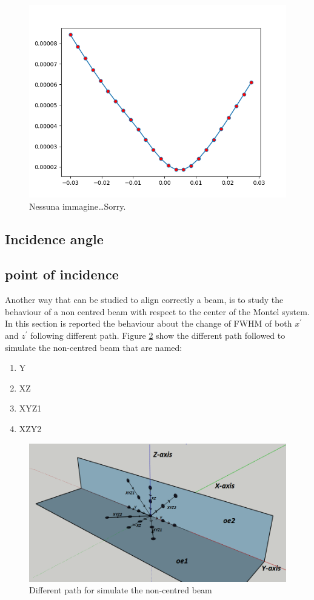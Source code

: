 \begin{figure}
%
\centering
%
\includegraphics[width=.6\textwidth]{Immagini/Chapter5/FWHMChangingOrt}
%
\caption{Nessuna immagine\dots Sorry.}
%
\label{fig:FWHM changing orthogonality}
%
\end{figure}
\subsection{Incidence angle}
\subsection{point of incidence}
Another way that can be studied to align correctly a beam, is to study the behaviour of a non centred beam with respect to the center of the Montel system. In this section is reported the behaviour about the change of FWHM of both $x^{'} $ and $z^{'} $ following different path. Figure \ref{fig: path} show the different path followed to simulate the non-centred beam that are named:
\begin{enumerate}
	\item Y
	\item XZ
	\item XYZ1
	\item XZY2
\end{enumerate}

\begin{figure}[H]
%
\centering
%
\includegraphics[width=1.\textwidth]{Immagini/Chapter5/Cattura2}
%
\caption{Different path for simulate the non-centred beam}
%
\label{fig: path}
%
\end{figure}

